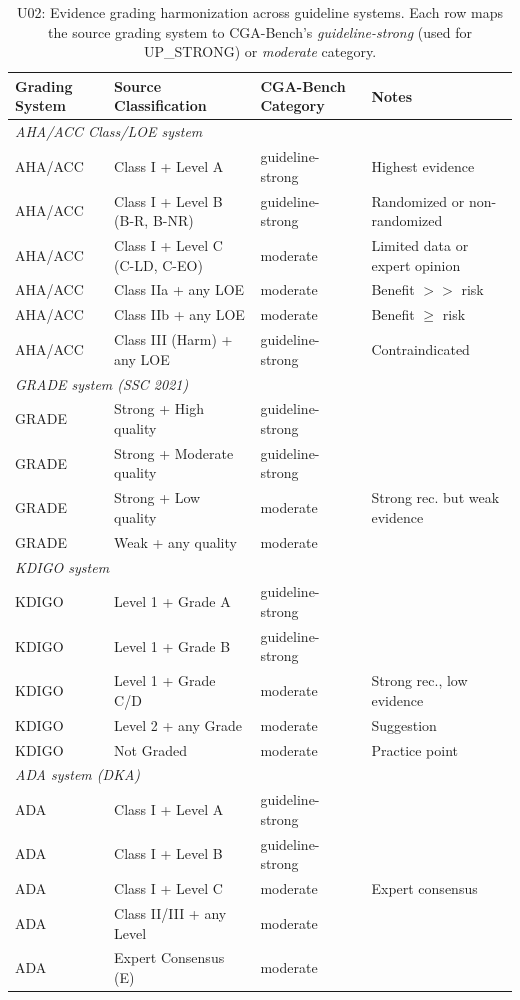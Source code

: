 \begin{table}[ht]
\centering
\small
\caption{U02: Evidence grading harmonization across guideline systems.
Each row maps the source grading system to CGA-Bench's
\emph{guideline-strong} (used for UP\_STRONG) or \emph{moderate} category.}
\label{tab:appendix_evidence_grading}
\begin{tabular}{llll}
\toprule
Grading System & Source Classification & CGA-Bench Category & Notes \\
\midrule
\multicolumn{4}{l}{\textit{AHA/ACC Class/LOE system}} \\
\midrule
AHA/ACC & Class I + Level A & guideline-strong & Highest evidence \\
AHA/ACC & Class I + Level B (B-R, B-NR) & guideline-strong & Randomized or non-randomized \\
AHA/ACC & Class I + Level C (C-LD, C-EO) & moderate & Limited data or expert opinion \\
AHA/ACC & Class IIa + any LOE & moderate & Benefit $>>$ risk \\
AHA/ACC & Class IIb + any LOE & moderate & Benefit $\geq$ risk \\
AHA/ACC & Class III (Harm) + any LOE & guideline-strong & Contraindicated \\
\midrule
\multicolumn{4}{l}{\textit{GRADE system (SSC 2021)}} \\
\midrule
GRADE & Strong + High quality & guideline-strong & \\
GRADE & Strong + Moderate quality & guideline-strong & \\
GRADE & Strong + Low quality & moderate & Strong rec. but weak evidence \\
GRADE & Weak + any quality & moderate & \\
\midrule
\multicolumn{4}{l}{\textit{KDIGO system}} \\
\midrule
KDIGO & Level 1 + Grade A & guideline-strong & \\
KDIGO & Level 1 + Grade B & guideline-strong & \\
KDIGO & Level 1 + Grade C/D & moderate & Strong rec., low evidence \\
KDIGO & Level 2 + any Grade & moderate & Suggestion \\
KDIGO & Not Graded & moderate & Practice point \\
\midrule
\multicolumn{4}{l}{\textit{ADA system (DKA)}} \\
\midrule
ADA & Class I + Level A & guideline-strong & \\
ADA & Class I + Level B & guideline-strong & \\
ADA & Class I + Level C & moderate & Expert consensus \\
ADA & Class II/III + any Level & moderate & \\
ADA & Expert Consensus (E) & moderate & \\
\bottomrule
\end{tabular}
\end{table}
